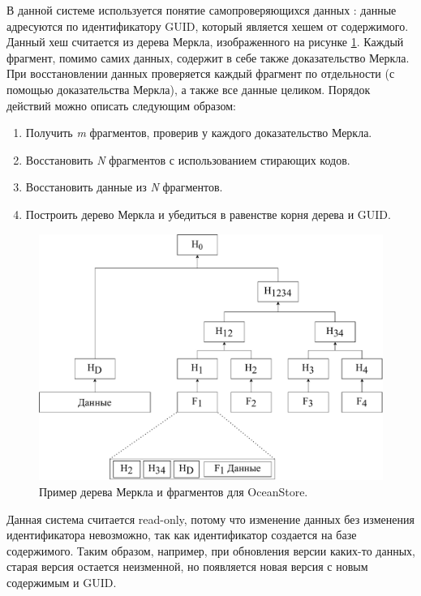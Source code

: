 В данной системе используется понятие самопроверяющихся данных \cite{selfverify}: данные адресуются по идентификатору GUID, который является хешем от содержимого. Данный хеш считается из дерева Меркла, изображенного на рисунке \ref{fig:ocean}. Каждый фрагмент, помимо самих данных, содержит в себе также доказательство Меркла. При восстановлении данных проверяется каждый фрагмент по отдельности (с помощью доказательства Меркла), а также все данные целиком. Порядок действий можно описать следующим образом:
\begin{enumerate}
	\item Получить \textit{m} фрагментов, проверив у каждого доказательство Меркла.
	\item Восстановить \textit{N} фрагментов с использованием стирающих кодов.
	\item Восстановить данные из \textit{N} фрагментов. %
	\item Построить дерево Меркла и убедиться в равенстве корня дерева и GUID.
\end{enumerate}

\begin{figure}[hbtp]
	\centering
	\includegraphics[width=\textwidth]{img/ocean.pdf}
	\caption{Пример дерева Меркла и фрагментов для OceanStore.}
	\label{fig:ocean}
\end{figure}

Данная система считается read-only, потому что изменение данных без изменения идентификатора невозможно, так как идентификатор создается на базе содержимого. Таким образом, например, при обновления версии каких-то данных, старая версия остается неизменной, но появляется новая версия с новым содержимым и GUID.

